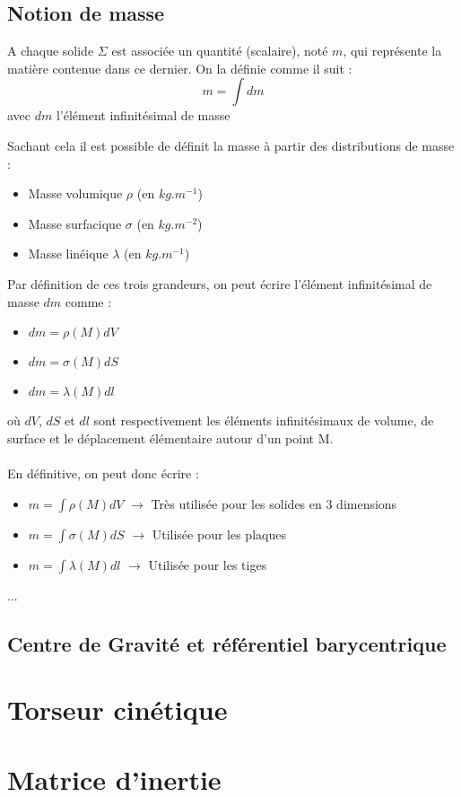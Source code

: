 \subsection{Notion de masse}
\begin{defi}
A chaque solide $\Sigma$ est associée un quantité (scalaire), noté $m$, qui représente la matière contenue dans ce dernier. On la définie comme il suit :
$$m=\int dm$$
avec $dm$ l'élément infinitésimal de masse
\end{defi}
Sachant cela il est possible de définit la masse à partir des distributions de masse :
\begin{itemize}
    \item Masse volumique $\rho$ (en $kg.m^{-1}$)
    \item Masse surfacique $\sigma$ (en $kg.m^{-2}$)
    \item Masse linéique $\lambda$ (en $kg.m^{-1}$)
\end{itemize}
Par définition de ces trois grandeurs, on peut écrire l'élément infinitésimal de masse $dm$ comme :
\begin{itemize}
    \item $dm=\rho(M)dV$
    \item $dm=\sigma(M)dS$
    \item $dm=\lambda(M)dl$
\end{itemize}
où $dV$, $dS$ et $dl$ sont respectivement les éléments infinitésimaux de volume, de surface et le déplacement élémentaire autour d'un point M.\\
 \\
En définitive, on peut donc écrire :
\begin{itemize}
    \item $m=\int \rho(M)dV$ $\rightarrow$ Très utilisée pour les solides en 3 dimensions
    \item $m=\int \sigma(M)dS$ $\rightarrow$ Utilisée pour les plaques
    \item $m=\int \lambda(M)dl$ $\rightarrow$ Utilisée pour les tiges
\end{itemize}
\begin{ex}
...
\end{ex}
\subsection{Centre de Gravité et référentiel barycentrique}
\section{Torseur cinétique}
\section{Matrice d'inertie}